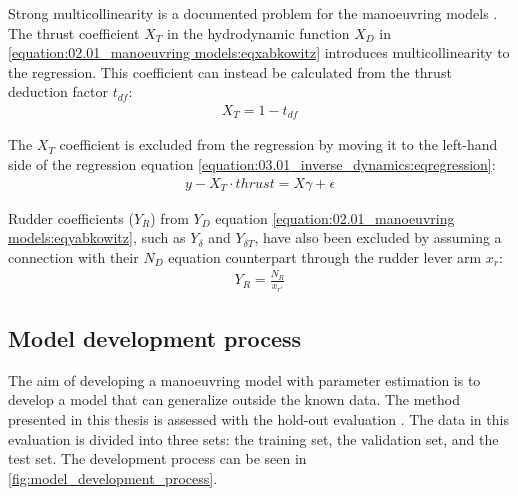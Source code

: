 Strong multicollinearity is a documented problem for the manoeuvring models \cite{luo_parameter_2016, wang_quantifying_2018}.
The thrust coefficient \(X_T\) in the hydrodynamic function \(X_D\) in \autoref{equation:02.01_manoeuvring models:eqxabkowitz} introduces multicollinearity to the regression. This coefficient can instead be calculated from the thrust deduction factor \(t_{df}\):
\begin{equation}\label{equation:03.01_inverse_dynamics:eqXthrust}
\begin{split}\displaystyle X_{T} = 1 - t_{df}\end{split}
\end{equation}

\noindent The \(X_T\) coefficient is excluded from the regression by moving it to the left-hand side of the regression equation \autoref{equation:03.01_inverse_dynamics:eqregression}:
\begin{equation}\label{equation:03.01_inverse_dynamics:eqexclude}
\begin{split}y-X_T \cdot thrust = X \gamma + \epsilon\end{split}
\end{equation}

\noindent Rudder coefficients (\(Y_R\)) from \(Y_D\) equation \autoref{equation:02.01_manoeuvring models:eqyabkowitz}, such as \(Y_{\delta}\) and \(Y_{\delta T}\), have also been excluded by assuming a connection with their \(N_D\) equation counterpart through the rudder lever arm \(x_r\):
\begin{equation}\label{equation:03.01_inverse_dynamics:eqyr}
\begin{split}\displaystyle Y_{R} = \frac{N_{R}}{x_{r'}}\end{split}
\end{equation}

\subsection{Model development process}
\label{sec:model_development_process}
The aim of developing a manoeuvring model with parameter estimation is to develop a model that can generalize outside the known data. The method presented in this thesis is assessed with the hold-out evaluation \cite{sammut_holdout_2017}. The data in this evaluation is divided into three sets: the training set, the validation set, and the test set. The development process can be seen in \autoref{fig:model_development_process}.

